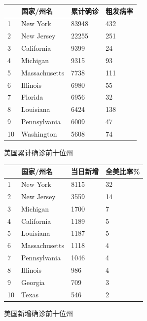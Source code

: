 \documentclass[]{article}
\begin{document}
\begin{minipage}{\textwidth}
        \begin{minipage}[H]{0.5\textwidth}
        \centering
           \begin{tabular}{@{}llll@{}}
           \toprule
              & 国家/州名         & 累计确诊  & 粗发病率 \\ \midrule
           1  & New York      & 83948 & 432  \\
           2  & New Jersey    & 22255 & 251  \\
           3  & California    & 9399  & 24   \\
           4  & Michigan      & 9315  & 93   \\
           5  & Massachusetts & 7738  & 111  \\
           6  & Illinois      & 6980  & 55   \\
           7  & Florida       & 6956  & 32   \\
           8  & Louisiana     & 6424  & 138  \\
           9  & Pennsylvania  & 6009  & 47   \\
           10 & Washington    & 5608  & 74   \\ \bottomrule
           \end{tabular}
            \makeatletter{}\makeatother\caption{美国累计确诊前十位州}
        \end{minipage}
        \begin{minipage}[H]{0.5\textwidth}
        \centering
           \begin{tabular}{@{}llll@{}}
          \toprule
             & 国家/州名         & 当⽇新增 & 全美⽐率\% \\ \midrule
          1  & New York      & 8115 & 32     \\
          2  & New Jersey    & 3559 & 14     \\
          3  & Michigan      & 1700 & 7      \\
          4  & California    & 1189 & 5      \\
          5  & Louisiana     & 1187 & 5      \\
          6  & Massachusetts & 1118 & 4      \\
          7  & Pennsylvania  & 1046 & 4      \\
          8  & Illinois      & 986  & 4      \\
          9  & Georgia       & 709  & 3      \\
          10 & Texas         & 546  & 2      \\ \bottomrule
          \end{tabular}
      \makeatletter{}\makeatother\caption{美国新增确诊前十位州}
    \end{minipage}
\end{minipage}
\end{document}
